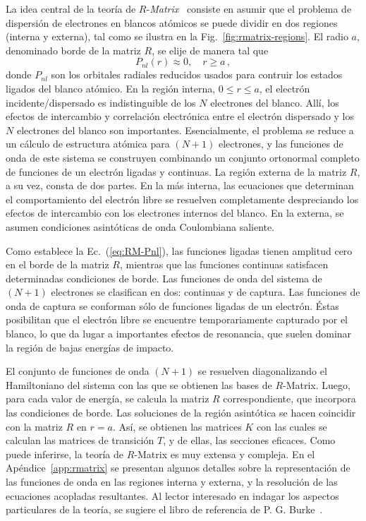La idea central de la teoría de $R$-\textit{Matrix}~\cite{Burke:11,
Burke:75,Griffin:07} consiste en asumir que el problema de dispersión de 
electrones en blancos atómicos se puede dividir en dos regiones (interna 
y externa), tal como se ilustra en la Fig.~\ref{fig:rmatrix-regions}. El 
radio $a$, denominado borde de la matriz $R$, se elije de manera tal que 
\begin{equation}
P_{nl}(r)\approx 0, \quad r\geq a\,,
\label{eq:RM-Pnl}
\end{equation}
donde $P_{nl}$ son los orbitales radiales reducidos usados para contruir 
los estados ligados del blanco atómico. En la región interna, 
$0\leq r\leq a$, el electrón incidente/dispersado es indistinguible de 
los $N$ electrones del blanco. Allí, los efectos de intercambio y 
correlación electrónica entre el electrón dispersado y los $N$ 
electrones del blanco son importantes. Esencialmente, el problema se 
reduce a un cálculo de estructura atómica para $(N+1)$ electrones, y las 
funciones de onda de este sistema se construyen combinando un conjunto 
ortonormal completo de funciones de un electrón ligadas y continuas. La 
región externa de la matriz $R$, a su vez, consta de dos partes. En la 
más interna, las ecuaciones que determinan el comportamiento del 
electrón libre se resuelven completamente despreciando los efectos 
de intercambio con los electrones internos del blanco. En la externa, se 
asumen condiciones asintóticas de onda Coulombiana saliente. 

Como establece la Ec.~(\ref{eq:RM-Pnl}), las funciones ligadas tienen 
amplitud cero en el borde de la matriz $R$, mientras que las funciones 
continuas satisfacen determinadas condiciones de borde. Las funciones de 
onda del sistema de $(N+1)$ electrones se clasifican en dos: continuas y 
de captura. Las funciones de onda de captura se conforman sólo de 
funciones ligadas de un electrón. Éstas posibilitan que el electrón 
libre se encuentre temporariamente capturado por el blanco, lo 
que da lugar a importantes efectos de resonancia, que suelen dominar la 
región de bajas energías de impacto. 

El conjunto de funciones de onda $(N+1)$ se resuelven diagonalizando el
Hamiltoniano del sistema con las que se obtienen las bases de 
$R$-Matrix. Luego, para cada valor de energía, se calcula la matriz $R$ 
correspondiente, que incorpora las condiciones de borde. Las soluciones 
de la región asintótica se hacen coincidir con la matriz $R$ en $r=a$. 
Así, se obtienen las matrices $K$ con las cuales se calculan las 
matrices de transición $T$, y de ellas, las secciones eficaces. 
Como puede inferirse, la teoría de $R$-Matrix es muy extensa y compleja.
En el Apéndice~\ref{app:rmatrix} se presentan algunos detalles sobre la 
representación de las funciones de onda en las regiones interna y 
externa, y la resolución de las ecuaciones acopladas resultantes. 
Al lector interesado en indagar los aspectos particulares de la teoría,
se sugiere el libro de referencia de P. G. Burke~\cite{Burke:11}.

